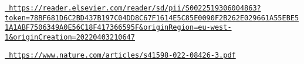 \href{https://reader.elsevier.com/reader/sd/pii/S0022519306004863?token=78BF681D6C2BD437B197C04DD8C67F1614E5C85E0090F2B262E029661A55EBE51A1ABF7506349A0E56C18F417366595F&originRegion=eu-west-1&originCreation=20220403210647}{\texttt{ https\+://reader.\+elsevier.\+com/reader/sd/pii/\+S0022519306004863?token=78\+BF681\+D6\+C2\+BD437\+B197\+C04\+DD8\+C67\+F1614\+E5\+C85\+E0090\+F2\+B262\+E029661\+A55\+EBE51\+A1\+ABF7506349\+A0\+E56\+C18\+F417366595\+F\&origin\+Region=eu-\/west-\/1\&origin\+Creation=20220403210647}}

\href{https://www.nature.com/articles/s41598-022-08426-3.pdf}{\texttt{ https\+://www.\+nature.\+com/articles/s41598-\/022-\/08426-\/3.\+pdf}} 